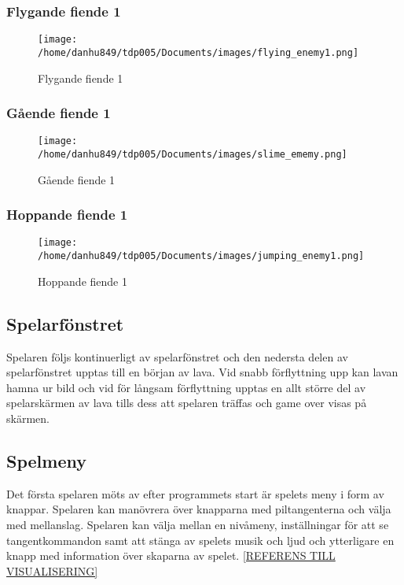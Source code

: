 \documentclass{TDP005mall}
\begin{document}
\subsubsection{Flygande fiende 1}
\begin{figure}[h]
  \centerline{\texttt{[image: /home/danhu849/tdp005/Documents/images/flying\_enemy1.png]}}
  \caption{Flygande fiende 1\label{fig:1}}
\end{figure}

\subsubsection{Gående fiende 1}
\begin{figure}[h]
  \centerline{\texttt{[image: /home/danhu849/tdp005/Documents/images/slime\_ememy.png]}}
  \caption{Gående fiende 1\label{fig:2}}
\end{figure}

\subsubsection{Hoppande fiende 1}
\begin{figure}[h]
  \centerline{\texttt{[image: /home/danhu849/tdp005/Documents/images/jumping\_enemy1.png]}}
  \caption{Hoppande fiende 1\label{fig:3}}
\end{figure}



\subsection{Spelarfönstret}
Spelaren följs kontinuerligt av spelarfönstret och den nedersta delen av spelarfönstret upptas till en början av lava. Vid snabb förflyttning upp kan lavan hamna ur bild och vid för långsam förflyttning upptas en allt större del av spelarskärmen av lava tills dess att spelaren träffas och game over visas på skärmen.


\subsection{Spelmeny}
Det första spelaren möts av efter programmets start är spelets meny i form av knappar. Spelaren kan manövrera över knapparna med piltangenterna och välja med mellanslag. Spelaren kan välja mellan en nivåmeny, inställningar för att se tangentkommandon samt att stänga av spelets musik och ljud och ytterligare en knapp med information över skaparna av spelet.  \ref{REFERENS TILL VISUALISERING} 
\end{document}
